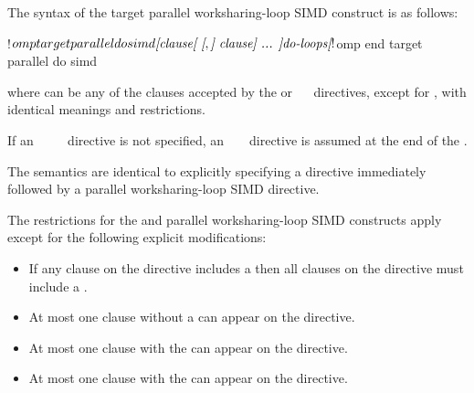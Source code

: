 \begin{fortranspecific}
The syntax of the target parallel worksharing-loop SIMD construct is as follows:

\begin{ompfPragma}
!$omp target parallel do simd \plc{[clause[ [},\plc{] clause] ... ]}
    \plc{do-loops}
\plc{[}!$omp end target parallel do simd\plc{]}
\end{ompfPragma}

where  can be any of the clauses accepted by the  or
~~ directives, except for , with identical meanings and restrictions.

If an ~~~~ directive is not specified, an
~  ~ directive is assumed at the end of
the .
\end{fortranspecific}

\descr
The semantics are identical to explicitly specifying a  directive
immediately followed by a parallel worksharing-loop SIMD directive.


\restrictions
The restrictions for the  and parallel worksharing-loop SIMD constructs apply except for the following explicit modifications:

\begin{itemize}
\item If any  clause on the directive includes a
       then all  clauses
      on the directive must include a .

\item At most one  clause without a
       can appear on the directive.

\item At most one  clause with the 
       can appear on the directive.


\item At most one  clause with the 
       can appear on the directive.
\end{itemize}

